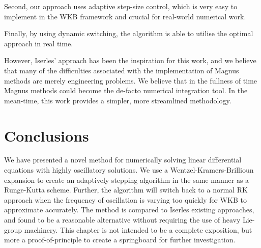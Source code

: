 Second, our approach uses adaptive step-size control, which is very easy to implement in the WKB framework and crucial for real-world numerical work.

Finally, by using dynamic switching, the algorithm is able to utilise the optimal approach in real time.

However, Iserles' approach has been the inspiration for this work, and we believe that many of the difficulties associated with the implementation of Magnus methods are merely engineering problems. We believe that in the fullness of time Magnus methods could become the de-facto numerical integration tool. In the mean-time, this work provides a simpler, more streamlined methodology.


\section{Conclusions}



We have presented a novel method for numerically solving linear differential equations with highly oscillatory solutions. We use a Wentzel-Kramers-Brillioun expansion to create an adaptively stepping algorithm in the same manner as a Runge-Kutta scheme. Further, the algorithm will switch back to a normal RK approach when the frequency of oscillation is varying too quickly for WKB to approximate accurately. The method is compared to Iserles existing approaches, and found to be a reasonable alternative without requiring the use of heavy Lie-group machinery. This chapter is not intended to be a complete exposition, but more a proof-of-principle to create a springboard for further investigation.




\begin{subappendices}
  
\end{subappendices}

